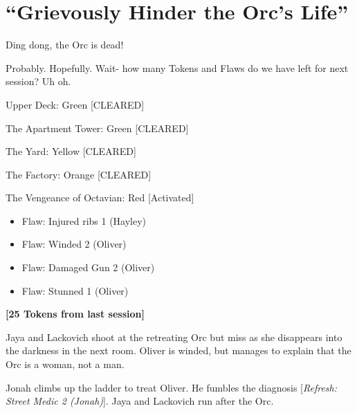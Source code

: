 \setcounter{chapter}{ 22 }
\chapter{\textbf{``Grievously Hinder the Orc's Life''} }







Ding dong, the Orc is dead!



Probably.  Hopefully.  Wait- how many Tokens and Flaws do we have left for next session?  Uh oh.








{\parskip=0pt
Upper Deck: Green {[}CLEARED{]}

The Apartment Tower: Green {[}CLEARED{]}

The Yard: Yellow {[}CLEARED{]}

The Factory: Orange {[}CLEARED{]}

The Vengeance of Octavian: Red {[}Activated{]}
}


\begin{itemize}
\item  {\color[RGB]{255,0,0}Flaw: Injured ribs 1 (Hayley)} 
\item  {\color[RGB]{255,0,0}Flaw: Winded 2 (Oliver)} 
\item  {\color[RGB]{255,0,0}Flaw: Damaged Gun 2 (Oliver)}  
\item  {\color[RGB]{255,0,0}Flaw: Stunned 1 (Oliver)} 
\end{itemize}



\textbf{{[}25 Tokens from last session{]}}



Jaya and Lackovich shoot at the retreating Orc but miss as she disappears into the darkness in the next room.  Oliver is winded, but manages to explain that the Orc is a woman, not a man.



Jonah climbs up the ladder to treat Oliver.  He fumbles the diagnosis {[}\textit{Refresh: Street Medic 2 (Jonah)}{]}.  Jaya and Lackovich run after the Orc.



